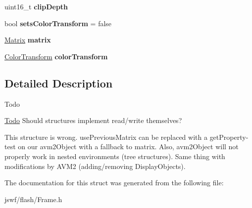 \begin{DoxyCompactItemize}
\item 
\hypertarget{structjswf_1_1flash_1_1_display_list_entry_ae5eb13f0f96f4313c60f181d52fb329e}{uint16\+\_\+t {\bfseries clip\+Depth}}\label{structjswf_1_1flash_1_1_display_list_entry_ae5eb13f0f96f4313c60f181d52fb329e}

\item 
\hypertarget{structjswf_1_1flash_1_1_display_list_entry_a34005f670c4b2a3608ad54a084d71b3a}{bool {\bfseries sets\+Color\+Transform} = false}\label{structjswf_1_1flash_1_1_display_list_entry_a34005f670c4b2a3608ad54a084d71b3a}

\item 
\hypertarget{structjswf_1_1flash_1_1_display_list_entry_aafb3c754661465d530a59ed09334bc04}{\hyperlink{structjswf_1_1flash_1_1_matrix}{Matrix} {\bfseries matrix}}\label{structjswf_1_1flash_1_1_display_list_entry_aafb3c754661465d530a59ed09334bc04}

\item 
\hypertarget{structjswf_1_1flash_1_1_display_list_entry_a868636e7c8d50e8d556c6b75a3fbae9d}{\hyperlink{structjswf_1_1flash_1_1_color_transform}{Color\+Transform} {\bfseries color\+Transform}}\label{structjswf_1_1flash_1_1_display_list_entry_a868636e7c8d50e8d556c6b75a3fbae9d}

\end{DoxyCompactItemize}


\subsection{Detailed Description}
\begin{DoxyRefDesc}{Todo}
\item[\hyperlink{todo__todo000011}{Todo}]Should structures implement read/write themselves? 

This structure is wrong. {\ttfamily use\+Previous\+Matrix} can be replaced with a {\ttfamily get\+Property}-\/test on our {\ttfamily avm2\+Object} with a fallback to {\ttfamily matrix}. Also, {\ttfamily avm2\+Object} will not properly work in nested environments (tree structures). Same thing with modifications by A\+V\+M2 (adding/removing Display\+Objects). \end{DoxyRefDesc}


The documentation for this struct was generated from the following file\+:\begin{DoxyCompactItemize}
\item 
jswf/flash/Frame.\+h\end{DoxyCompactItemize}
